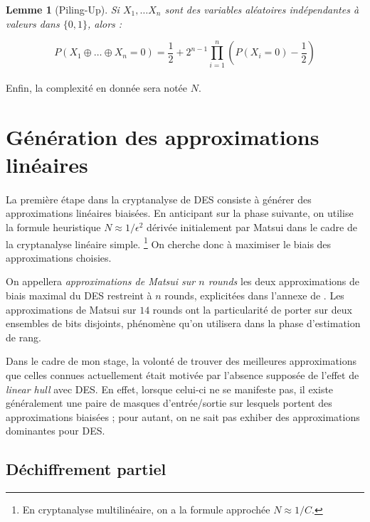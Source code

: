 \documentclass{scrartcl}
\newtheorem*{lemma}{Lemme}
\begin{document}
\begin{lemma}[Piling-Up]
	Si $X_1, \ldots X_n$ sont des variables aléatoires indépendantes à valeurs dans $\{0,1\}$, alors :

$$P(X_1 \oplus \ldots \oplus X_n=0)=\frac{1}{2}+2^{n-1}\prod_{i=1}^n \left(P(X_i=0)-\frac{1}{2}\right)$$
\end{lemma}

\paragraph*{}
Enfin, la complexité en donnée sera notée $N$.

\section{Génération des approximations linéaires}

\paragraph*{}
La première étape dans la cryptanalyse de DES consiste à générer des approximations linéaires biaisées. En anticipant sur la phase
suivante, on utilise la formule heuristique $N \approx 1/\epsilon^2$ dérivée initialement par Matsui dans le cadre de la cryptanalyse linéaire
simple. \footnote{En cryptanalyse multilinéaire, on a la formule approchée $N \approx 1/C$.} On cherche donc à maximiser le biais des approximations choisies.

On appellera \textit{approximations de Matsui sur $n$ rounds} les deux approximations de biais maximal du DES restreint à $n$ rounds, explicitées dans l'annexe de \cite{Matsui1994}. Les
approximations de Matsui sur $14$ rounds ont la particularité de porter sur deux ensembles de bits disjoints, phénomène
qu'on utilisera dans la phase d'estimation de rang.

Dans le cadre de mon stage, la volonté de trouver des meilleures approximations que celles connues actuellement était motivée par l'absence supposée
de l'effet de \textit{linear hull} \cite{Nyberg1995} avec DES. En effet, lorsque celui-ci ne se manifeste pas, il existe généralement une paire
de masques d'entrée/sortie sur lesquels portent des approximations biaisées ; pour autant, on ne sait pas exhiber des approximations dominantes pour DES.

\subsection{Déchiffrement partiel}
\end{document}
